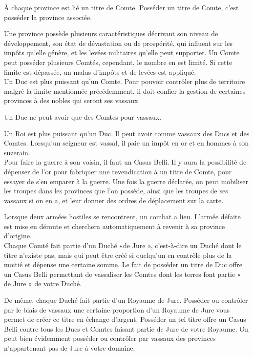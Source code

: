 \documentclass[a4paper,12pt]{article}
\begin{document}
À chaque province est lié un titre de Comte. Posséder un titre de Comte, c'est posséder la province associée. 

Une province possède plusieurs caractéristiques décrivant son niveau de développement, son état de dévastation ou de prospérité, qui influent sur les impôts qu'elle génère, et les levées militaires qu'elle peut supporter. Un Comte peut posséder plusieurs Comtés, cependant, le nombre en est limité. Si cette limite est dépassée, un malus d’impôts et de levées est appliqué.  \\

Un Duc est plus puissant qu’un Comte. Pour pouvoir contrôler plus de territoire malgré la limite mentionnée précédemment, il doit confier la gestion de certaines provinces à des nobles qui seront ses vassaux. 

Un Duc ne peut avoir que des Comtes pour vassaux.

Un Roi est plus puissant qu’un Duc. Il peut avoir comme vassaux des Ducs et des Comtes.
Lorsqu’un seigneur est vassal, il paie un impôt en or et en hommes à son suzerain. \\

Pour faire la guerre à son voisin, il faut un Casus Belli. Il y aura la possibilité de dépenser de l’or pour fabriquer une revendication à un titre de Comte, pour essayer de s’en emparer à la guerre. Une fois la guerre déclarée, on peut mobiliser les troupes dans les provinces que l’on possède, ainsi que les troupes de ses vassaux si on en a, et leur donner des ordres de déplacement sur la carte.

Lorsque deux armées hostiles se rencontrent, un combat a lieu. L’armée défaite est mise en déroute et cherchera automatiquement à revenir à sa province d’origine. \\

Chaque Comté fait partie d’un Duché «de Jure », c’est-à-dire un Duché dont le titre n’existe pas, mais qui peut être créé si quelqu’un en contrôle plus de la moitié et dépense une certaine somme. Le fait de posséder un titre de Duc offre un Casus Belli permettant de vassaliser les Comtes dont les terres font partie « de Jure » de votre Duché.

De même, chaque Duché fait partie d’un Royaume de Jure. Posséder ou contrôler par le biais de vassaux une certaine proportion d’un Royaume de Jure vous permet de créer ce titre en échange d’argent. Posséder un tel titre offre un Casus Belli contre tous les Ducs et Comtes faisant partie de Jure de votre Royaume.
On peut bien évidemment posséder ou contrôler par vassaux des provinces n’appartenant pas de Jure à votre domaine. \\
\end{document}
